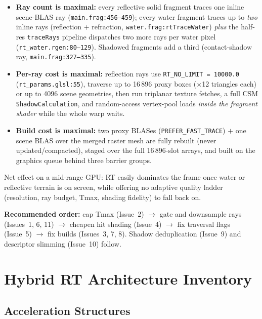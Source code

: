 \documentclass[11pt,a4paper]{article}
\begin{document}
\begin{itemize}
    \item \textbf{Ray count is maximal:} every reflective solid fragment traces one inline scene-BLAS ray (\texttt{main.frag:456--459}); every water fragment traces up to \textit{two} inline rays (reflection $+$ refraction, \texttt{water.frag:rtTraceWater}) \textit{plus} the half-res \texttt{traceRays} pipeline dispatches two more rays per water pixel (\texttt{rt\_water.rgen:80--129}). Shadowed fragments add a third (contact-shadow ray, \texttt{main.frag:327--335}).
    \item \textbf{Per-ray cost is maximal:} reflection rays use \texttt{RT\_NO\_LIMIT = 10000.0} (\texttt{rt\_params.glsl:55}), traverse up to 16\,896 proxy boxes ($\times$12 triangles each) or up to 4096 scene geometries, then run triplanar texture fetches, a full CSM \texttt{ShadowCalculation}, and random-access vertex-pool loads \textit{inside the fragment shader} while the whole warp waits.
    \item \textbf{Build cost is maximal:} two proxy BLASes (\texttt{PREFER\_FAST\_TRACE}) $+$ one scene BLAS over the merged raster mesh are fully rebuilt (never updated/compacted), staged over the full 16\,896-slot arrays, and built on the graphics queue behind three barrier groups.
\end{itemize}

Net effect on a mid-range GPU: RT easily dominates the frame once water or reflective terrain is on screen, while offering no adaptive quality ladder (resolution, ray budget, Tmax, shading fidelity) to fall back on.

\textbf{Recommended order:} cap Tmax (Issue~2) $\rightarrow$ gate and downsample rays (Issues~1, 6, 11) $\rightarrow$ cheapen hit shading (Issue~4) $\rightarrow$ fix traversal flags (Issue~5) $\rightarrow$ fix builds (Issues~3, 7, 8). Shadow deduplication (Issue~9) and descriptor slimming (Issue~10) follow.

\section{Hybrid RT Architecture Inventory}

\subsection{Acceleration Structures}
\end{document}
